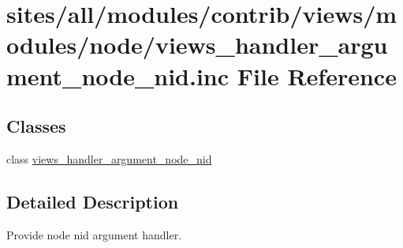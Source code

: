 \hypertarget{views__handler__argument__node__nid_8inc}{
\section{sites/all/modules/contrib/views/modules/node/views\_\-handler\_\-argument\_\-node\_\-nid.inc File Reference}
\label{views__handler__argument__node__nid_8inc}
}
\subsection*{Classes}
\begin{CompactItemize}
\item 
class \hyperlink{classviews__handler__argument__node__nid}{views\_\-handler\_\-argument\_\-node\_\-nid}
\end{CompactItemize}


\subsection{Detailed Description}
Provide node nid argument handler. 